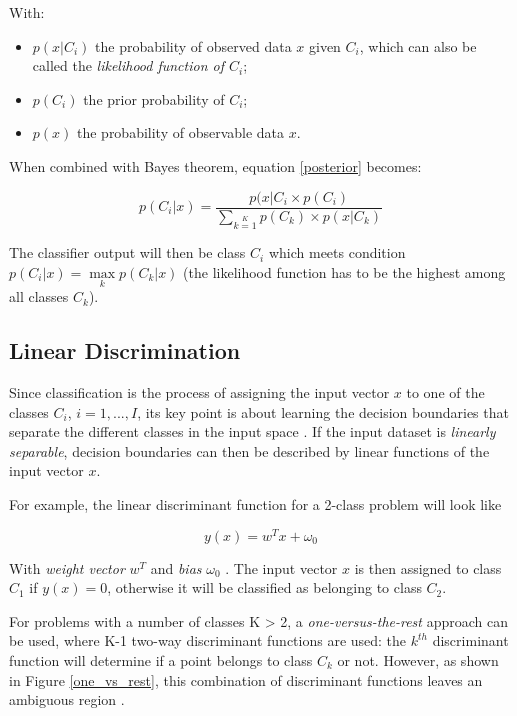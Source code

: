 \noindent With:
\begin{itemize}
\item $p(x|C_i)$ the probability of observed data $x$ given $C_i$, which can also be called the \textit{likelihood function of $C_i$};
\item $p(C_i)$ the prior probability of $C_i$;
\item $p(x)$ the probability of observable data $x$.
\end{itemize} 

\noindent When combined with Bayes theorem, equation \ref{posterior} becomes:

\begin{equation}
	p(C_i|x) = \frac{p(x|C_i \times p(C_i)}{\sum\limits_{k=1}\limits^{K} p(C_k) \times p(x|C_k)}
	\label{posterior_bayes}
\end{equation}

\noindent The classifier output will then be class $C_i$ which meets condition $p(C_i|x) = \max \limits_{k} p(C_k|x)$ (the likelihood function has to be the highest among all classes $C_k$).

\subsection{Linear Discrimination}

\vspace{\baselineskip}
\noindent Since classification is the process of assigning the input vector $x$ to one of the classes $C_i$, $i=1, ..., I$, its key point is about learning the decision boundaries that separate the different classes in the input space \cite{BIS06}. If the input dataset is \textit{linearly separable}, decision boundaries can then be described by linear functions of the input vector $x$.
\newline

\noindent For example, the linear discriminant function for a 2-class problem will look like 

\begin{equation}
y(x) = w^Tx + \omega_0
\end{equation}

\noindent With \textit{weight vector} $w^T$ and \textit{bias} $\omega_0$ \cite{BIS06}. The input vector $x$ is then assigned to class $C_1$ if $y(x) = 0$, otherwise it will be classified as belonging to class $C_2$.
\newline

\noindent For problems with a number of classes K > 2, a \textit{one-versus-the-rest} approach can be used, where K-1 two-way discriminant functions are used: the $k^{th}$ discriminant function will determine if a point belongs to class $C_k$ or not. However, as shown in Figure \ref{one_vs_rest}, this combination of discriminant functions leaves an ambiguous region \cite{BIS06}. 
\newline

